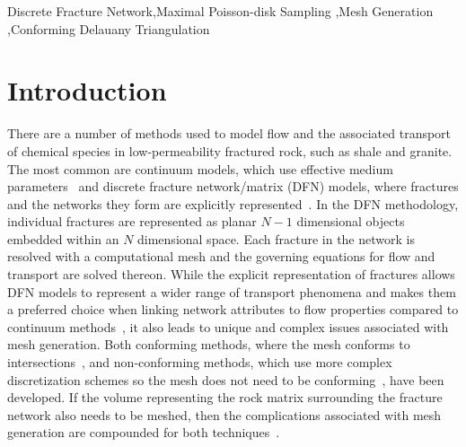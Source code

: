 \documentclass[preprint, 10pt]{elsarticle}
\theoremstyle{definition}
\theoremstyle{remark}
\begin{document}
\begin{frontmatter}
\begin{keyword}
Discrete Fracture Network\sep	Maximal Poisson-disk Sampling \sep Mesh Generation \sep Conforming Delauany Triangulation   



\end{keyword}

\end{frontmatter}


\section{Introduction}

There are a number of methods used to model flow and the associated transport of chemical species in low-permeability fractured rock, such as shale and granite.
The most common are continuum models, which use effective medium parameters~\cite{gerke1993dual,lichtner2014modeling,neuman1988use,neuman2005trends,tsang1996tracer,zimmerman1993numerical} and discrete fracture network/matrix (DFN) models, where fractures and the networks they form are explicitly represented~\cite{cacas1990modeling,long1982porous,nordqvist1992variable}. 
In the DFN methodology, individual fractures are represented as planar $N-1$ dimensional objects embedded within an $N$ dimensional space.
Each fracture in the network is resolved with a computational mesh and the governing equations for flow and transport are solved thereon.
While the explicit representation of fractures allows DFN models to represent a wider range of transport phenomena and makes them a preferred choice when linking network attributes to flow properties compared to continuum methods~\cite{hadgu2017comparative,hyman2018dispersion,hyman2019linking}, it also leads to unique and complex issues associated with mesh generation.
Both conforming methods, where the mesh conforms to intersections~\cite{hyman2014conforming,mustapha2007new,mustapha2011efficient}, and non-conforming methods, which use more complex discretization schemes so the mesh does not need to be conforming~\cite{berrone2013pde,erhel2009flow,pichot2010mixed,pichot2012generalized}, have been developed.  
If the volume representing the rock matrix surrounding the fracture network also needs to be meshed, then the complications associated with mesh generation are compounded for both techniques~\cite{berre2018flow}.
\end{document}
